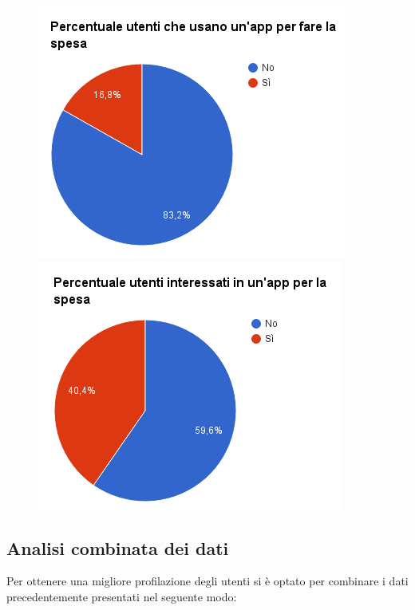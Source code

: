 \begin{figure}[H]
\centering
\begin{minipage}{.48\textwidth}
	\includegraphics[scale=0.45]{img/chart_usi_app_spesa}
\end{minipage}
\hfill
\begin{minipage}{.49\textwidth}
	\includegraphics[scale=0.45]{img/chart_vorresti_app_spesa}
\end{minipage}
\end{figure}

\subsection{Analisi combinata dei dati}
Per ottenere una migliore profilazione degli utenti si è optato per combinare i
dati precedentemente presentati nel seguente modo:

